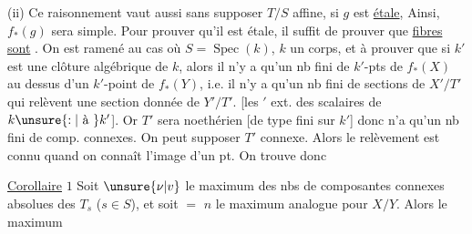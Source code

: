(ii) Ce raisonnement vaut aussi sans supposer $T/S$
affine, si $g$ est \uline{étale},  Ainsi, $f_\ast(g)$ sera
simple. Pour prouver qu'il est étale, il suffit
de prouver que  \uline{fibres sont}   . On est ramené
au cas où $S=\operatorname{Spec}(k)$, $k$ un corps, et
à prouver que si $k'$ est une
clôture algébrique de $k$, alors il
n'y a qu'un nb fini de $k'$-pts de $f_\ast(X)$ au dessus d'un
$k'$-point de $f_\ast(Y)$, i.e.  il n'y a qu'un nb fini
de sections de $X'/T'$ qui
relèvent une section donnée de $Y'/T'$.
[les $'$  ext. des scalaires de $k\unsure{:|\text{ à }}k'$].
Or $T'$ sera noethérien [de type fini sur $k'$]
donc n'a qu'un nb fini de comp. connexes.
On peut supposer $T'$ connexe. Alors le
relèvement est connu quand on
connaît l'image d'un pt. On trouve
donc

\uline{Corollaire} $1$ Soit $\unsure{\nu|v}$ le maximum des nbs
 de composantes connexes absolues
des $T_s$ ($s\in S$), et soit  $=$ $n$ le
maximum analogue pour $X/Y$. Alors le maximum
